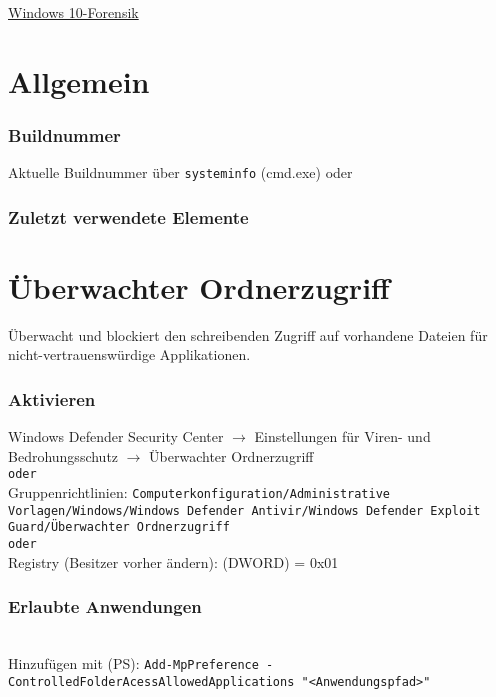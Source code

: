 \begin{center}
     \Large{\underline{Windows 10-Forensik}} \\
\end{center}

\section{Allgemein}

\subsubsection{Buildnummer}
Aktuelle Buildnummer über \texttt{systeminfo} (cmd.exe) oder 

\subsubsection{Zuletzt verwendete Elemente}

\section{Überwachter Ordnerzugriff}
Überwacht und blockiert den schreibenden Zugriff auf vorhandene Dateien für nicht-vertrauenswürdige Applikationen.


\subsubsection{Aktivieren}
Windows Defender Security Center $\rightarrow$ Einstellungen für Viren- und Bedrohungsschutz $\rightarrow$ Überwachter Ordnerzugriff\\
\texttt{oder}\\
Gruppenrichtlinien: \texttt{Computerkonfiguration/Administrative Vorlagen/Windows/Windows Defender Antivir/Windows Defender Exploit Guard/Überwachter Ordnerzugriff}\\
\texttt{oder}\\
Registry (Besitzer vorher ändern):  (DWORD) = 0x01

\subsubsection{Erlaubte Anwendungen}
\\
Hinzufügen mit (PS): \texttt{Add-MpPreference -ControlledFolderAcessAllowedApplications "<Anwendungspfad>"}

